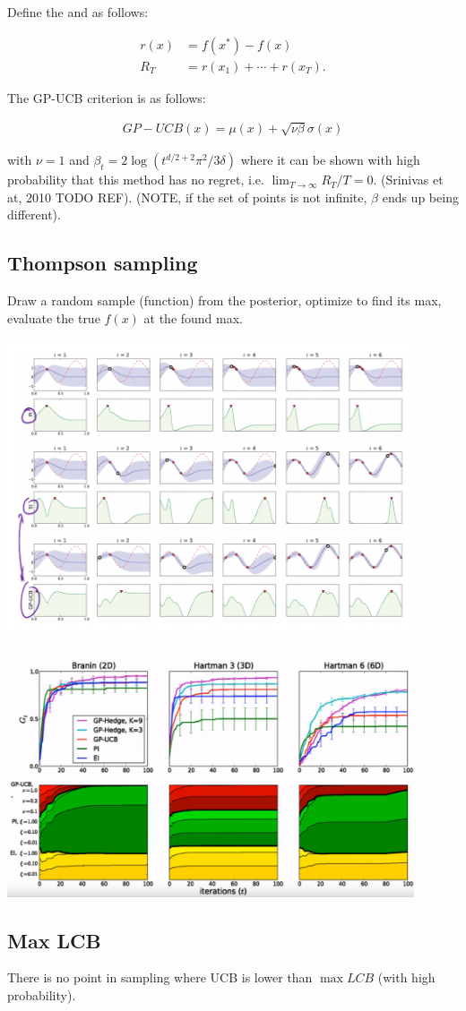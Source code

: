 Define the  and  as follows:

\begin{align}
  r(x) &= f(x^*) - f(x) \\
  R_T &= r(x_1) + \cdots + r(x_T).
\end{align}

The GP-UCB criterion is as follows:

\begin{align}
  GP-UCB(x) = \mu(x) + \sqrt{\nu \beta} \sigma(x)
\end{align}

with $\nu = 1$ and $\beta_t = 2 \log(t^{d/2 + 2}\pi^2 / 3 \delta)$ where it can
be shown with high probability that this method has no regret, i.e. $\lim_{T
\rightarrow \infty} R_T / T = 0$. (Srinivas et at, 2010 TODO REF). (NOTE, if
the set of points is not infinite, $\beta$ ends up being different).


\subsection{Thompson sampling}

Draw a random sample (function) from the posterior, optimize to find its max,
evaluate the true $f(x)$ at the found max.

\includegraphics[width=0.9\textwidth]{img/acquisition-functions.png}

\includegraphics[width=0.9\textwidth]{img/portfolios-of-acquisition-functions.png}


\subsection{Max LCB}

There is no point in sampling where UCB is lower than $\max LCB$ (with high probability).
